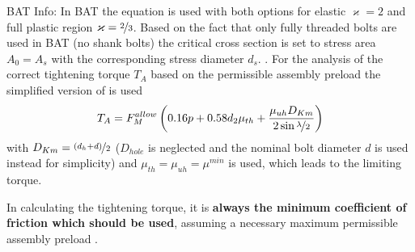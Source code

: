 \begin{colbox}{BAT Info:}
    In BAT the equation  is used with both options for elastic $\varkappa=2$ and full 
    plastic region $\varkappa=\nicefrac{2}{3}$. Based on the fact that only fully threaded bolts are used 
    in BAT (no shank bolts) the critical cross section is set to stress area $A_0=A_s$ with the 
    corresponding stress diameter $d_s$. . For the 
    analysis of the correct tightening torque $T_A$ based on the permissible assembly preload the
    simplified version of  is used 
    \begin{equation}
      T_A = F_M^{allow} \left( 0.16 p + 0.58 d_2 \mu_{th} + 
        \frac{\mu_{uh} D_{Km}}{2\sin \nicefrac{\lambda}{2}} \right)
    \end{equation}
    with $D_{Km}=\nicefrac{(d_h+d)}{2}$ ($D_{hole}$ is neglected and the nominal bolt diameter $d$ is 
    used instead for simplicity) and $\mu_{th}=\mu_{uh}=\mu^{min}$ is used, which leads to the limiting 
    torque. 

    In calculating the tightening torque, it is \textbf{always the minimum coefficient of friction 
    which should be used}, assuming a necessary maximum permissible assembly preload \cite{VDI2230_1}.
\end{colbox}